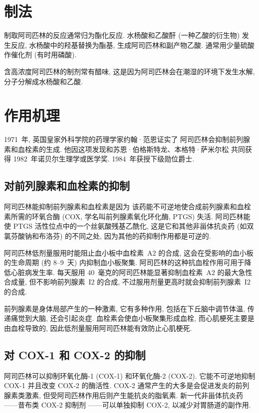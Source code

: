 \section{制法}

制取阿司匹林的反应通常归为酯化反应.
水杨酸和乙酸酐 (一种乙酸的衍生物) 发生反应,
水杨酸中的羟基替换为酯基, 生成阿司匹林和副产物乙酸.
通常用少量硫酸作催化剂 (有时用磷酸).

含高浓度阿司匹林的制剂常有醋味,
这是因为阿司匹林会在潮湿的环境下发生水解,
分子分解成水杨酸和乙酸.

\section{作用机理}

1971~年, 英国皇家外科学院的药理学家约翰·范恩证实了%
阿司匹林会抑制前列腺素和血栓素的生成.
他因这项发现和苏恩·伯格斯特龙、本格特·萨米尔松%
共同获得 1982~年诺贝尔生理学或医学奖.
1984~年获授下级勋位爵士.

\subsection{对前列腺素和血栓素的抑制}

阿司匹林能抑制前列腺素和血栓素是因为%
该药能不可逆地使合成前列腺素和血栓素所需的环氧合酶
(COX, 学名叫前列腺素氧化环化酶, PTGS) 失活.
阿司匹林能使 PTGS 活性位点中的一个丝氨酸残基乙酰化,
这是它和其他非甾体抗炎药 (如双氯芬酸钠和布洛芬) 的不同之处,
因为其他的药抑制作用都是可逆的.

阿司匹林低剂量服用时能阻止血小板中血栓素~A2 的合成,
这会在受影响的血小板的生命周期 (约 8--9~天) 内抑制血小板聚集.
阿司匹林的这种抗血栓作用可用于降低心脏病发生率.
每天服用 40~毫克的阿司匹林能显著抑制血栓素~A2 的最大急性合成量,
但不影响前列腺素~I2 的合成,
不过服用剂量更高时就会抑制前列腺素~I2 的合成.

前列腺素是身体局部产生的一种激素, 它有多种作用,
包括在下丘脑中调节体温, 传递痛觉到大脑, 还会引起炎症.
血栓素会使血小板聚集形成血栓,
而心肌梗死主要是由血栓导致的,
因此低剂量服用阿司匹林能有效防止心肌梗死.

\subsection{对 COX-1 和 COX-2 的抑制}

阿司匹林可以抑制环氧化酶-1 (COX-1) 和环氧化酶-2 (COX-2).
它能不可逆地抑制 COX-1 并且改变 COX-2 的酶活性.
COX-2 通常产生的大多是会促进发炎的前列腺素类激素,
但受阿司匹林作用后则产生能抗炎的脂氧素.
新一代非甾体抗炎药——昔布类 COX-2 抑制剂%
——可以单独抑制 COX-2, 以减少对胃肠道的副作用.

